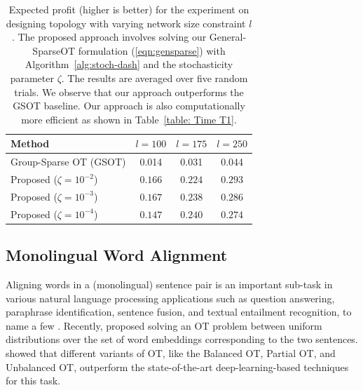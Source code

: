 \begin{table}[t]
\caption[Evaluation of proposed Sparse-OT framework for the task of designing a budget-constrained network topology.]{Expected profit (higher is better) for the experiment on designing topology with varying network size constraint $l$. The proposed approach involves solving our General-SparseOT formulation (\ref{eqn:gensparse}) with Algorithm~\ref{alg:stoch-dash} and the stochasticity parameter $\zeta$. The results are averaged over five random trials. We observe that our approach outperforms the GSOT baseline. Our approach is also computationally more efficient as shown in Table~\ref{table: Time T1}.}
\label{table-top}
\centering
\setlength{\tabcolsep}{4pt}
\begin{tabular}{lccc}
\toprule
Method & $l=100$ & $l=175$ & $l=250$\\
\midrule
    Group-Sparse OT (GSOT) \citep{ijcai2023p679} & {0.014} & {0.031} & {0.044} \\
    \rowcolor{green!10}
    Proposed ($\zeta= 10^{-2}$) & {$0.166$} & {$ 0.224$} & {$ \mathbf{0.293}$}\\
    \rowcolor{green!10}
    Proposed ($\zeta= 10^{-3}$) & {$\mathbf{0.167}$} & {$ 0.238$} & {$0.286$}\\
    \rowcolor{green!10}
    Proposed ($\zeta= 10^{-4}$) & {$0.147$} & {$\mathbf{0.240}$} & {$0.274$}\\
\bottomrule
\end{tabular}
\end{table}


\subsection{Monolingual Word Alignment}\label{exp:word-alignment}
Aligning words in a (monolingual) sentence pair is an important sub-task in various natural language processing applications such as question answering, paraphrase identification, sentence fusion, and textual entailment recognition, to name a few \citep{maccartney08,yao13,feldman19,brook21}. Recently, \citet{arase-etal-2023-unbalanced} proposed solving an OT problem between uniform distributions over the set of word embeddings corresponding to the two sentences. \citet{arase-etal-2023-unbalanced} showed that different variants of OT, like the Balanced OT, Partial OT, and Unbalanced OT, outperform the state-of-the-art deep-learning-based techniques \citep{JaliliSabet2020SimAlignHQ} for this task.

